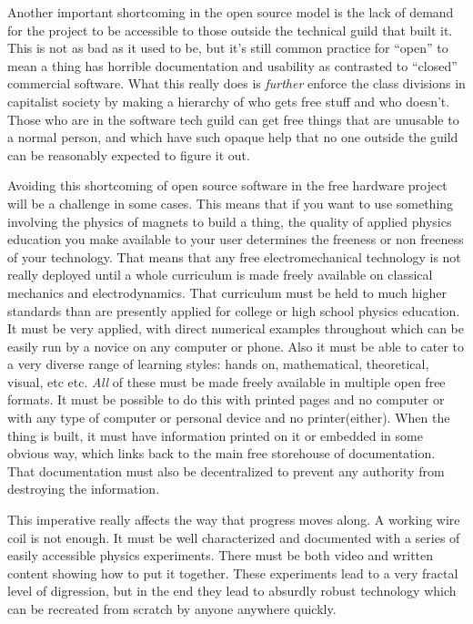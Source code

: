 Another important shortcoming in the open source model is the lack of
demand for the project to be accessible to those outside the technical
guild that built it. This is not as bad as it used to be, but it's still
common practice for ``open'' to mean a thing has horrible documentation
and usability as contrasted to ``closed'' commercial software. What this
really does is \emph{further} enforce the class divisions in capitalist
society by making a hierarchy of who gets free stuff and who doesn't.
Those who are in the software tech guild can get free things that are
unusable to a normal person, and which have such opaque help that no one
outside the guild can be reasonably expected to figure it out.

Avoiding this shortcoming of open source software in the free hardware
project will be a challenge in some cases. This means that if you want
to use something involving the physics of magnets to build a thing, the
quality of applied physics education you make available to your user
determines the freeness or non freeness of your technology. That means
that any free electromechanical technology is not really deployed until
a whole curriculum is made freely available on classical mechanics and
electrodynamics. That curriculum must be held to much higher standards
than are presently applied for college or high school physics education.
It must be very applied, with direct numerical examples throughout which
can be easily run by a novice on any computer or phone. Also it must be
able to cater to a very diverse range of learning styles: hands on,
mathematical, theoretical, visual, etc etc. \emph{All} of these must be
made freely available in multiple open free formats. It must be possible
to do this with printed pages and no computer or with any type of
computer or personal device and no printer(either). When the thing is
built, it must have information printed on it or embedded in some
obvious way, which links back to the main free storehouse of
documentation. That documentation must also be decentralized to prevent
any authority from destroying the information.

This imperative really affects the way that progress moves along. A
working wire coil is not enough. It must be well characterized and
documented with a series of easily accessible physics experiments. There
must be both video and written content showing how to put it together.
These experiments lead to a very fractal level of digression, but in the
end they lead to absurdly robust technology which can be recreated from
scratch by anyone anywhere quickly.

